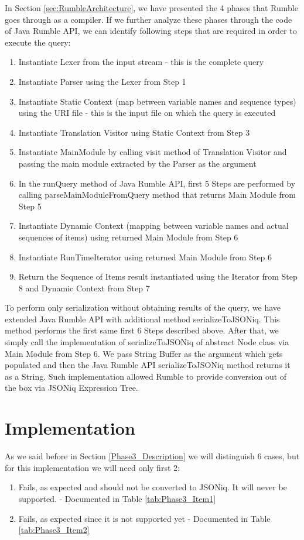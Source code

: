 In Section \ref{sec:RumbleArchitecture}, we have presented the 4 phases that Rumble goes through as a compiler. If we further analyze these phases through the code of Java Rumble API, we can identify following steps that are required in order to execute the query:
\begin{enumerate}
	\item Instantiate Lexer from the input stream - this is the complete query
	\item Instantiate Parser using the Lexer from Step 1
	\item Instantiate Static Context  (map between variable names and sequence types) using the URI file - this is the input file on which the query is executed 
	\item Instantiate Translation Visitor using Static Context from Step 3
	\item Instantiate MainModule by calling visit method of Translation Visitor and passing the main module extracted by the Parser as the argument
	\item In the runQuery method of Java Rumble API, first 5 Steps are performed by calling parseMainModuleFromQuery method that returns Main Module from Step 5
	\item Instantiate Dynamic Context (mapping between variable names and actual sequences of items) using returned Main Module from Step 6
	\item Instantiate RunTimeIterator using returned Main Module from Step 6
	\item Return the Sequence of Items result instantiated using the Iterator from Step 8 and Dynamic Context from Step 7
\end{enumerate}

To perform only serialization without obtaining results of the query, we have extended Java Rumble API with additional method serializeToJSONiq. This method performs the first same first 6 Steps described above. After that, we simply call the implementation of serializeToJSONiq of abstract Node class via Main Module from Step 6. We pass String Buffer as the argument which gets populated and then the Java Rumble API serializeToJSONiq method returns it as a String. Such implementation allowed Rumble to provide conversion out of the box via JSONiq Expression Tree.

\section{Implementation}
\label{sec:TestConverterImplementation}
As we said before in Section \ref{Phase3_Description} we will distinguish 6 cases, but for this implementation we will need only first 2: 
\begin{enumerate}
	\item Fails, as expected and should not be converted to JSONiq. It will never be supported. - Documented in Table \ref{tab:Phase3_Item1}
	\item Fails, as expected since it is not supported yet - Documented in Table \ref{tab:Phase3_Item2}
\end{enumerate}

